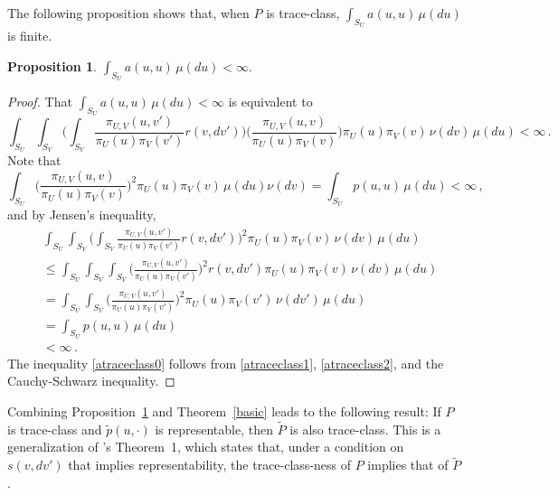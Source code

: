 \documentclass[11pt]{article}
\newcommand{\pcite}[1]{\citeauthor{#1}'s \citeyearpar{#1}}
\newtheorem{proposition}[theorem]{Proposition}
\begin{document}
        The following proposition shows that, when $P$ is trace-class,
        $\int_{S_U} a(u,u) \, \mu(du)$ is finite.
	\begin{proposition} \label{traceclassA}
		$\int_{S_U} a(u,u) \, \mu(du) < \infty.$
	\end{proposition}
	\begin{proof}
		That $\int_{S_U} a(u,u) \, \mu(du) < \infty$ is equivalent to
		\begin{equation} \label{atraceclass0}
		\int_{S_U} \int_{S_V} \bigg( \int_{S_V} \frac{\pi_{U,V}(u,v')}{\pi_U(u)\pi_V(v')} r(v,dv') \bigg) \bigg( \frac{\pi_{U,V}(u,v)}{\pi_U(u)\pi_V(v)} \bigg) \pi_U(u) \pi_V(v) \, \nu(dv) \, \mu(du) < \infty \,.
		\end{equation}
		Note that
		\begin{equation} \label{atraceclass1}
		\int_{S_U} \bigg( \frac{\pi_{U,V}(u,v)}{\pi_U(u)\pi_V(v)} \bigg)^2 \pi_U(u) \pi_V(v) \, \mu(du)\nu(dv) = \int_{S_U} p(u,u) \, \mu(du) < \infty \,,
		\end{equation}
		and by Jensen's inequality,
		\begin{equation} \label{atraceclass2}
		\begin{aligned}
		&\int_{S_U} \int_{S_V} \bigg( \int_{S_V} \frac{\pi_{U,V}(u,v')}{\pi_U(u)\pi_V(v')} r(v,dv') \bigg)^2 \pi_U(u) \pi_V(v) \,\nu(dv) \, \mu(du) \\
		&\leq \int_{S_U} \int_{S_V} \int_{S_V} \bigg( \frac{\pi_{U,V}(u,v')}{\pi_U(u)\pi_V(v')} \bigg)^2 r(v,dv') \pi_U(u) \pi_V(v) \,\nu(dv) \, \mu(du) \\
		&= \int_{S_U} \int_{S_V} \bigg( \frac{\pi_{U,V}(u,v')}{\pi_U(u)\pi_V(v')} \bigg)^2 \pi_U(u) \pi_V(v') \,\nu(dv') \, \mu(du) \\
		&= \int_{S_U} p(u,u) \, \mu(du) \\
		& < \infty \,.
		\end{aligned}
		\end{equation}
		The inequality \eqref{atraceclass0} follows from \eqref{atraceclass1}, \eqref{atraceclass2}, and the Cauchy-Schwarz inequality.
	\end{proof}
	
        Combining Proposition~\ref{traceclassA} and
        Theorem~\ref{basic} leads to the following result: If $P$ is
        trace-class and $\tilde{p}(u,\cdot)$ is representable, then
        $\tilde{P}$ is also trace-class.  This is a generalization of
        \pcite{khare2011spectral} Theorem~1, which states that, under
        a condition on $s(v,dv')$ that implies representability, the
        trace-class-ness of $P$ implies that of $\tilde{P}$.
\end{document}
